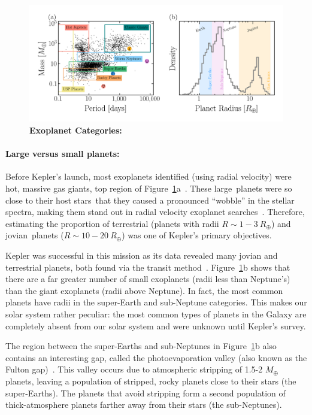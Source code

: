 \begin{figure}
\begin{center}
  \centerline{\includegraphics[width=1.1\linewidth]{src/figures/scatter_categories.png}}
  \caption{\textbf{Exoplanet Categories:}  }
  \label{fig:exo_categories}
\end{center}
\end{figure}

% 

\paragraph{Large versus small planets:}
Before Kepler's launch, most exoplanets identified (using radial velocity) were hot, massive gas giants, top region of Figure~\ref{fig:exo_categories}a~\cite{kepler_mission}.
These large planets were so close to their host stars that they caused a pronounced ``wobble'' in the stellar spectra, making them stand out in radial velocity exoplanet searches~\cite{kepler_mission}.
Therefore, estimating  the proportion of terrestrial (planets with radii $R\sim1-3\ R_{\oplus}$)  and jovian planets  ($R\sim10-20\ R_{\oplus}$) was one of Kepler's primary objectives.

Kepler was successful in this mission as its data revealed many jovian and terrestrial planets, both found via the transit method~\cite{kepler_mission}.
Figure~\ref{fig:exo_categories}b shows that there are a far greater number of small exoplanets (radii less than Neptune's) than the giant exoplanets (radii above Neptune).
In fact, the most common planets have radii in the super-Earth and sub-Neptune categories. 
This makes our solar system rather peculiar: the most common types of planets in the Galaxy are completely absent from our solar system and were unknown until Kepler’s survey.

The region between the super-Earths and sub-Neptunes in Figure~\ref{fig:exo_categories}b also contains an interesting gap, called the photoevaporation valley (also known as the Fulton gap)~\cite{Owen:2013:ApJ, VanEylen:2018:MNRAS}. 
This valley occurs due to atmospheric stripping of 1.5-2 $M_{\oplus}$ planets, leaving a population of stripped, rocky planets close to their stars (the super-Earths). 
The planets that avoid stripping form a second population of thick-atmosphere planets farther away from their stars (the sub-Neptunes).

